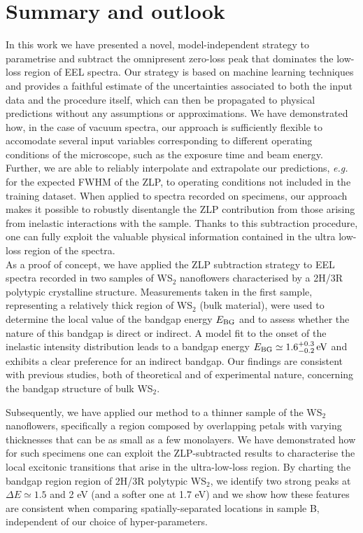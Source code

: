 \section{Summary and outlook}
\label{sec:summary}

In this work we have presented a novel, model-independent strategy to parametrise and subtract
the omnipresent zero-loss peak that dominates the low-loss region
of EEL spectra.
%
Our strategy is based on machine learning techniques and provides a faithful estimate of the
uncertainties associated to both the input data and the procedure itself,
which can  then be propagated to physical predictions without any assumptions or approximations.
%
We have demonstrated how, in the case of vacuum spectra, our approach
is sufficiently flexible to accomodate several input variables corresponding
to different operating conditions of the microscope, such as the exposure time and beam energy.
%
Further, we are able to reliably interpolate and
extrapolate our predictions, {\it e.g.} for the expected FWHM of the ZLP,
to operating conditions not included in the training dataset.
%
When applied to spectra recorded on specimens, our approach
makes it possible to robustly disentangle the ZLP contribution from
those arising from inelastic interactions with the sample.
%
Thanks to this subtraction procedure, one can fully exploit
the valuable physical information contained in the ultra low-loss region of
the spectra. \\

As a proof of concept, we have applied the ZLP subtraction
strategy to EEL spectra recorded in two samples of WS$_2$ nanoflowers characterised by a
2H/3R polytypic crystalline structure.
%
Measurements taken in the first sample, representing a relatively thick region of WS$_2$ (bulk material),
were used to determine
the local value of the bandgap energy $E_{\rm BG}$
and to assess whether the nature of this bandgap is direct or indirect.
%
A model fit to the onset of the inelastic intensity distribution leads to
a bandgap energy
$E_{\rm BG} \simeq 1.6^{+0.3}_{-0.2}\,{\rm eV}$ and 
exhibits a clear preference for an indirect bandgap.
%
Our findings are consistent with previous studies, both of theoretical
and of experimental nature, concerning the bandgap structure of bulk WS$_2$.

Subsequently, we have applied our method to a thinner sample of the WS$_2$ nanoflowers,
specifically a region composed by overlapping petals with varying
thicknesses that can be as small as a few monolayers.
%
We have demonstrated how for such specimens one can exploit the ZLP-subtracted results
to characterise the local excitonic transitions that arise in the ultra-low-loss region.
%
By charting the bandgap region region of 2H/3R polytypic WS$_2$,
we identify two strong peaks at $\Delta E\simeq 1.5$ and 2 eV
(and a softer one at 1.7 eV) and we show how
these features are consistent when comparing
spatially-separated locations in sample B, 
independent of our choice of hyper-parameters.

